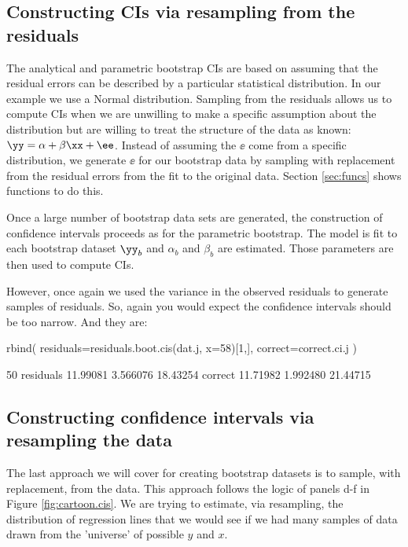 \subsection{Constructing CIs via resampling from the residuals}

The analytical and parametric bootstrap CIs are based on assuming that the residual errors can be described by a particular statistical distribution. In our example we use a Normal distribution. Sampling from the residuals allows us to compute CIs when we are unwilling to make a specific assumption about the distribution but are willing to treat the structure of the data as known: $\yy=\alpha+\beta \xx+\ee$. Instead of assuming the $\ee$ come from a specific distribution, we generate $\ee$ for our bootstrap data by sampling with replacement from the residual errors from the fit to the original data. Section \ref{sec:funcs} shows functions to do this.


Once a large number of bootstrap data sets are generated, the construction of confidence intervals proceeds as for the parametric bootstrap. The model is fit to each bootstrap dataset $\yy_b$ and $\alpha_b$ and $\beta_b$ are estimated. Those parameters are then used to compute CIs.  

However, once again we used the variance in the observed residuals to generate samples of residuals.  So, again you would expect the confidence intervals should be too narrow.  And they are:
\begin{Schunk}
\begin{Sinput}
 rbind(
   residuals=residuals.boot.cis(dat.j, x=58)[1,],
   correct=correct.ci.j
 )
\end{Sinput}
\begin{Soutput}
               50%     2.5%    97.5%
residuals 11.99081 3.566076 18.43254
correct   11.71982 1.992480 21.44715
\end{Soutput}
\end{Schunk}

\subsection{Constructing confidence intervals via resampling the data}

The last approach we will cover for creating bootstrap datasets is to sample, with replacement, from the data.  This approach follows the logic of panels d-f in Figure \ref{fig:cartoon.cis}.  We are trying to estimate, via resampling, the distribution of regression lines that we would see if we had many samples of data drawn from the 'universe' of possible $y$ and $x$.  

